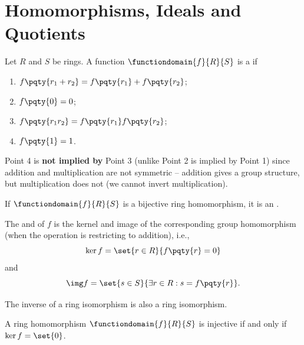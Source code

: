 \section{Homomorphisms, Ideals and Quotients}

\begin{definition}
    \label{def:ring-homomorphism}%
    Let \(R\) and \(S\) be rings. A function \(\functiondomain{f}{R}{S}\) is a  if
    \begin{enumerate}
        \item \(f\pqty{r_1 + r_2} = f\pqty{r_1} + f\pqty{r_2}\);
        \item \(f\pqty{0} = 0\);
        \item \(f\pqty{r_1 r_2} = f\pqty{r_1} f\pqty{r_2}\);
        \item \(f\pqty{1} = 1\).
    \end{enumerate}
\end{definition}

\begin{remark}
    Point 4 is \textbf{not implied by} Point 3 (unlike Point 2 is implied by Point 1) since addition and multiplication are not symmetric -- addition gives a group structure, but multiplication does not (we cannot invert multiplication).
\end{remark}

\begin{definition}
    \label{def:ring-isomorphism-kernel-image}%
    If \(\functiondomain{f}{R}{S}\) is a bijective ring homomorphism, it is an .

    The  and  of \(f\) is the kernel and image of the corresponding group homomorphism (when the operation is restricting to addition), i.e.,
    \[
        \ker f = \set{r \in R}{f \pqty{r} = 0}
    \]
    and
    \[
        \img f = \set{s \in S}{\exists r \in R: s = f\pqty{r}}.
    \]
\end{definition}

\begin{remark}
    The inverse of a ring isomorphism is also a ring isomorphism.
\end{remark}

\begin{lemma}
    \label{lem:homomorphisms-injective-trivial-kernel}%
    A ring homomorphism \(\functiondomain{f}{R}{S}\) is injective if and only if \(\ker f = \set{0}\).
\end{lemma}

